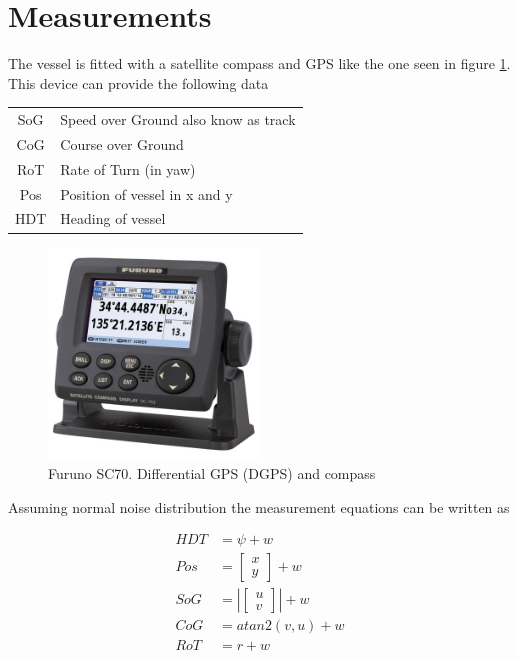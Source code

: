 \documentclass[12pt,a4]{article}
\begin{document}
\section{Measurements}
The vessel is fitted with a satellite compass and GPS like the one seen in figure \ref{fig:Furuno_SC70}. This device can provide the following data
\begin{table}[H]
	\centering
	\begin{tabular}{c|l}
		SoG & Speed over Ground also know as track \\
		CoG & Course over Ground                   \\
		RoT & Rate of Turn (in yaw)                \\
		Pos & Position of vessel in x and y        \\
		HDT & Heading of vessel
	\end{tabular}
\end{table}
\begin{figure}[H]
	\centering
	\includegraphics[width = 0.5\textwidth]{graphics/Furuno SC70.jpg}
	\caption{Furuno SC70. Differential GPS (DGPS) and compass}
	\label{fig:Furuno_SC70}
\end{figure}
Assuming normal noise distribution the measurement equations can be written as

\begin{align}
	HDT & = \psi + w                                    \\
	Pos & = \begin{bmatrix} x \\ y \end{bmatrix} + w              \\
	SoG & = \left|\begin{bmatrix} u \\ v \end{bmatrix}\right| + w \\
	CoG & = atan2(v,u) + w                              \\
	RoT & = r + w
\end{align}
\end{document}
